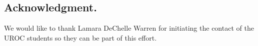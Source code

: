 \documentclass[A0,6pt]{article}
\begin{document}
\begin{multicols}{3}
{\tiny
\section*{\footnotesize Acknowledgment.}

We would like to thank Lamara DeChelle Warren for initiating the contact of the UROC students so they can be part of this effort. 



}


\end{multicols}
\end{document}
